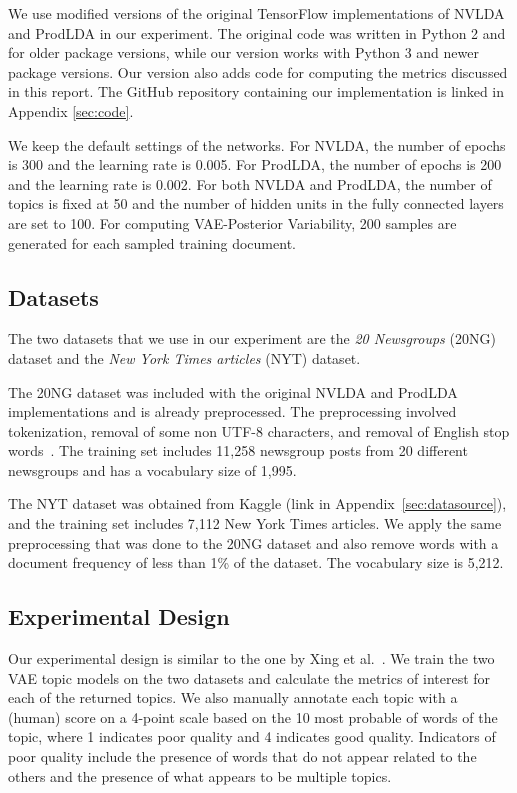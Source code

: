 \documentclass[10pt]{article}
\begin{document}
We use modified versions of the original TensorFlow implementations of NVLDA and ProdLDA in our experiment. The original code was written in Python 2 and for older package versions, while our version works with Python 3 and newer package versions. Our version also adds code for computing the metrics discussed in this report. The GitHub repository containing our implementation is linked in Appendix \ref{sec:code}.

We keep the default settings of the networks. For NVLDA, the number of epochs is 300 and the learning rate is 0.005. For ProdLDA, the number of epochs is 200 and the learning rate is 0.002. For both NVLDA and ProdLDA, the number of topics is fixed at 50 and the number of hidden units in the fully connected layers are set to 100. For computing VAE-Posterior Variability, 200 samples are generated for each sampled training document.

\subsection{Datasets}

The two datasets that we use in our experiment are the \textit{20 Newsgroups} (20NG) dataset and the \textit{New York Times articles} (NYT) dataset.

The 20NG dataset was included with the original NVLDA and ProdLDA implementations and is already preprocessed. The preprocessing involved tokenization, removal of some non UTF-8 characters, and removal of English stop words~\cite{Srivastava:2017}. The training set includes 11,258 newsgroup posts from 20 different newsgroups and has a vocabulary size of 1,995. 

The NYT dataset was obtained from Kaggle (link in Appendix~\ref{sec:datasource}), and the training set includes 7,112 New York Times articles. We apply the same preprocessing that was done to the 20NG dataset and also remove words with a document frequency of less than 1\% of the dataset. The vocabulary size is 5,212.

\subsection{Experimental Design}

Our experimental design is similar to the one by Xing et al.~. We train the two VAE topic models on the two datasets and calculate the metrics of interest for each of the returned topics. We also manually annotate each topic with a (human) score on a 4-point scale based on the 10 most probable of words of the topic, where 1 indicates poor quality and 4 indicates good quality. Indicators of poor quality include the presence of words that do not appear related to the others and the presence of what appears to be multiple topics.
\end{document}
